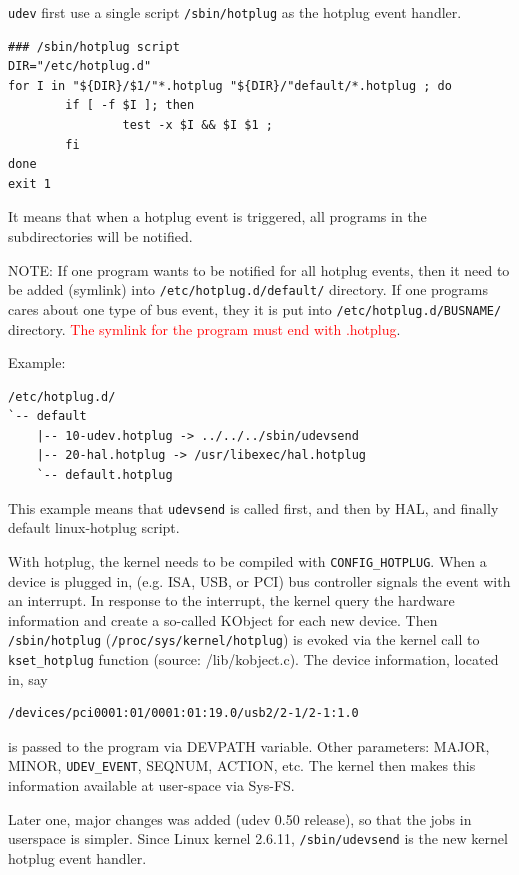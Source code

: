 \verb!udev! first use a single script \verb!/sbin/hotplug! as the hotplug event
handler.
\begin{verbatim}
### /sbin/hotplug script
DIR="/etc/hotplug.d"
for I in "${DIR}/$1/"*.hotplug "${DIR}/"default/*.hotplug ; do
        if [ -f $I ]; then
                test -x $I && $I $1 ;
        fi
done
exit 1
\end{verbatim}
It means that when a hotplug event is triggered, all programs in the
subdirectories will be notified. 

NOTE: If one program wants to be notified for all hotplug events, then it need
to be added (symlink) into \verb!/etc/hotplug.d/default/! directory. If one
programs cares about one type of bus event, they it is put into
\verb!/etc/hotplug.d/BUSNAME/! directory.
\textcolor{red}{The symlink for the program must end with .hotplug}. 

Example:
\begin{verbatim}
/etc/hotplug.d/
`-- default
    |-- 10-udev.hotplug -> ../../../sbin/udevsend
    |-- 20-hal.hotplug -> /usr/libexec/hal.hotplug
    `-- default.hotplug
\end{verbatim}
This example means that \verb!udevsend! is called first, and then by HAL, and
finally default linux-hotplug script.

\begin{framed}

With hotplug, the kernel needs to be compiled with \verb!CONFIG_HOTPLUG!. When a
device is plugged in, (e.g. ISA, USB, or PCI) bus controller signals the event
with an interrupt. In response to the interrupt, the kernel query the hardware
information and create a so-called KObject for each new device. Then
\verb!/sbin/hotplug! (\verb!/proc/sys/kernel/hotplug!) is evoked via the kernel
call to \verb!kset_hotplug! function (source: /lib/kobject.c). The device
information, located in, say
\begin{verbatim}
/devices/pci0001:01/0001:01:19.0/usb2/2-1/2-1:1.0 
\end{verbatim}
is passed to the program via DEVPATH variable. Other parameters: MAJOR, MINOR,
\verb!UDEV_EVENT!, SEQNUM, ACTION, etc. The kernel then makes this information
available at user-space via Sys-FS.

\end{framed}


Later one, major changes was added (udev 0.50 release), so that the
jobs in userspace is simpler. Since Linux kernel 2.6.11, \verb!/sbin/udevsend!
is the new kernel hotplug event handler.

